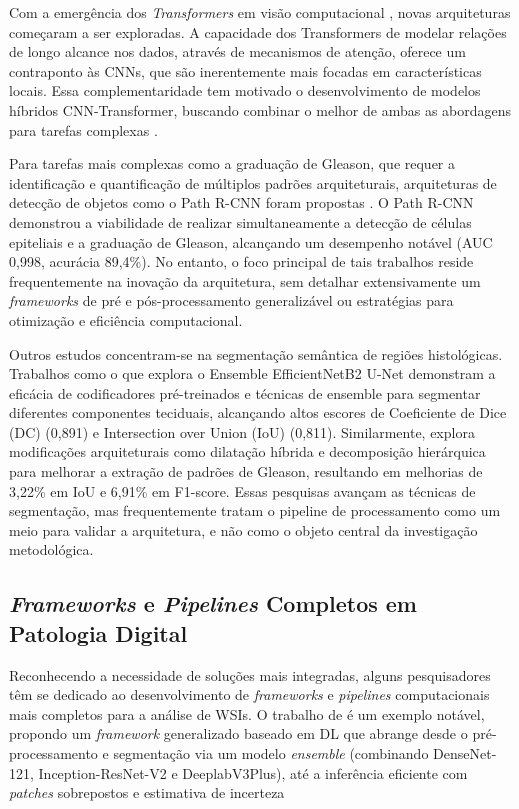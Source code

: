 Com a emergência dos \textit{Transformers} em visão computacional \cite{Dosovitskiy2021}, novas arquiteturas começaram a ser exploradas. A capacidade dos Transformers de modelar relações de longo alcance nos dados, através de mecanismos de atenção, oferece um contraponto às CNNs, que são inerentemente mais focadas em características locais. Essa complementaridade tem motivado o desenvolvimento de modelos híbridos CNN-Transformer, buscando combinar o melhor de ambas as abordagens para tarefas complexas \cite{10326274}.

Para tarefas mais complexas como a graduação de Gleason, que requer a identificação e quantificação de múltiplos padrões arquiteturais, arquiteturas de detecção de objetos como o Path R-CNN foram propostas \cite{Li2021PathRCNN}. %
O Path R-CNN demonstrou a viabilidade de realizar simultaneamente a detecção de células epiteliais e a graduação de Gleason, alcançando um desempenho notável (AUC 0,998, acurácia 89,4\%). No entanto, o foco principal de tais trabalhos reside frequentemente na inovação  da arquitetura, sem detalhar extensivamente um \textit{frameworks} de pré e pós-processamento generalizável ou estratégias para otimização e eficiência computacional.

Outros estudos concentram-se na segmentação semântica de regiões histológicas. Trabalhos como o que explora o Ensemble EfficientNetB2 U-Net \cite{Ikromjanov2023}
demonstram a eficácia de codificadores pré-treinados e técnicas de ensemble para segmentar diferentes componentes teciduais, alcançando altos escores de Coeficiente de Dice (DC) (0,891) e Intersection over Union (IoU) (0,811). Similarmente, \cite{Hassan2021}
explora modificações arquiteturais como dilatação híbrida e decomposição hierárquica para melhorar a extração de padrões de Gleason, resultando em melhorias de 3,22\% em IoU e 6,91\% em F1-score. Essas pesquisas avançam as técnicas de segmentação, mas frequentemente tratam o pipeline de processamento como um meio para validar a arquitetura, e não como o objeto central da investigação metodológica.

\subsection{\textit{Frameworks} e \textit{Pipelines} Completos em Patologia Digital}\label{subsec:frameworks_pipelines_patologia}

Reconhecendo a necessidade de soluções mais integradas, alguns pesquisadores têm se dedicado ao desenvolvimento de \textit{frameworks} e \textit{pipelines} computacionais mais completos para a análise de WSIs. O trabalho de \textcite{Khened2021} é um exemplo notável, propondo um \textit{framework} generalizado baseado em DL que abrange desde o pré-processamento e segmentação via um modelo \textit{ensemble} (combinando DenseNet-121, Inception-ResNet-V2 e DeeplabV3Plus), até a inferência eficiente com \textit{patches} sobrepostos e estimativa de incerteza %

